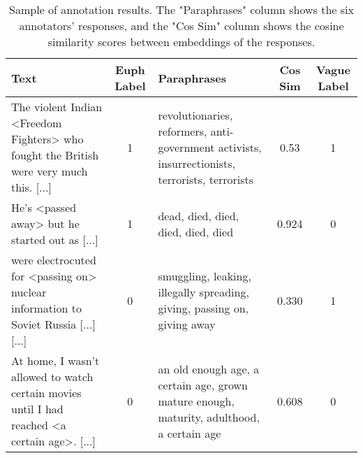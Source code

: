 \documentclass[11pt]{article}
\begin{document}
\begin{table*}[]
\begin{center}
\begin{tabularx}{\textwidth}{|L|c|Y|c|c|} 
\hline
\textbf{Text} & \textbf{Euph Label} & \textbf{Paraphrases} & \textbf{Cos Sim} & \textbf{Vague Label} \\
\hline
The violent Indian <Freedom Fighters> who fought the British were very much this. [...] & 1 & revolutionaries, reformers, anti-government activists, insurrectionists, terrorists, terrorists & 0.53 & 1 \\
\hline
[...] He's <passed away> but he started out as [...] & 1 & dead, died, died, died, died, died & 0.924 & 0 \\
\hline
[...] were electrocuted for <passing on> nuclear information to Soviet Russia [...] [...] & 0 & smuggling, leaking, illegally spreading, giving, passing on, giving away & 0.330 & 1 \\
\hline
At home, I wasn't allowed to watch certain movies until I had reached <a certain age>. [...] & 0 & an old enough age, a certain age, grown mature enough, maturity, adulthood, a certain age & 0.608 & 0 \\
\hline
\end{tabularx}
\end{center}
\caption{Sample of annotation results. The "Paraphrases" column shows the six annotators' responses, and the "Cos Sim" column shows the cosine similarity scores between embeddings of the responses.}
\label{tbl:annotation_examples}
\end{table*}
\end{document}
